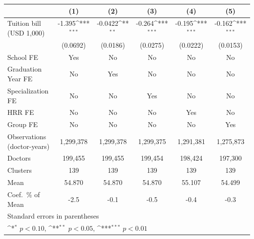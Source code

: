 {
\def\sym#1{\ifmmode^{#1}\else\(^{#1}\)\fi}
\begin{tabular}{l*{5}{c}}
\hline\hline
                    &\multicolumn{1}{c}{(1)}         &\multicolumn{1}{c}{(2)}         &\multicolumn{1}{c}{(3)}         &\multicolumn{1}{c}{(4)}         &\multicolumn{1}{c}{(5)}         \\
\hline
Tuition bill (USD 1,000)&      -1.395\sym{***}&     -0.0422\sym{**} &      -0.264\sym{***}&      -0.195\sym{***}&      -0.162\sym{***}\\
                    &    (0.0692)         &    (0.0186)         &    (0.0275)         &    (0.0222)         &    (0.0153)         \\
[1em]
School FE           &         Yes         &          No         &          No         &          No         &          No         \\
[1em]
Graduation Year FE  &          No         &         Yes         &          No         &          No         &          No         \\
[1em]
Specialization FE   &          No         &          No         &         Yes         &          No         &          No         \\
[1em]
HRR FE              &          No         &          No         &          No         &         Yes         &          No         \\
[1em]
Group FE            &          No         &          No         &          No         &          No         &         Yes         \\
\hline
Observations (doctor-years)&   1,299,378         &   1,299,378         &   1,299,375         &   1,291,381         &   1,275,873         \\
Doctors             &     199,455         &     199,455         &     199,454         &     198,424         &     197,300         \\
Clusters            &         139         &         139         &         139         &         139         &         139         \\
Mean                &      54.870         &      54.870         &      54.870         &      55.107         &      54.499         \\
Coef.\ \% of Mean   &        -2.5         &        -0.1         &        -0.5         &        -0.4         &        -0.3         \\
\hline\hline
\multicolumn{6}{l}{\footnotesize Standard errors in parentheses}\\
\multicolumn{6}{l}{\footnotesize \sym{*} \(p<0.10\), \sym{**} \(p<0.05\), \sym{***} \(p<0.01\)}\\
\end{tabular}
}
